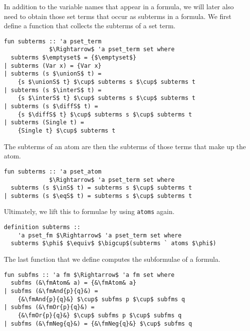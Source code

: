 \documentclass[sigplan,10pt,anonymous,review]{acmart}
\newcommand{\unionS}{\sqcup_\text{s}}
\newcommand{\interS}{\sqcap_\text{s}}
\newcommand{\diffS}{-_\text{s}}
\newcommand{\inS}{\in_\text{s}}
\newcommand{\eqS}{=_\text{s}}
\newcommand{\fmAnd}[2]{#1 $\boldsymbol{\land}$ #2}
\newcommand{\fmOr}[2]{#1 $\boldsymbol{\lor}$ #2}
\newcommand{\fmNegSymbol}{\boldsymbol{\neg}}
\newcommand{\fmNeg}[1]{$\fmNegSymbol$ #1}
\newcommand{\fmAtom}{\textbf{A}}
\begin{document}
In addition to the variable names that appear in a formula, we will later also need to obtain those set terms that occur as subterms in a formula. 
We first define a function that collects the subterms of a set term.
\begin{lstlisting}
fun subterms :: 'a pset_term
             $\Rightarrow$ 'a pset_term set where
  subterms $\emptyset$ = {$\emptyset$}
| subterms (Var x) = {Var x}
| subterms (s $\unionS$ t) =
    {s $\unionS$ t} $\cup$ subterms s $\cup$ subterms t
| subterms (s $\interS$ t) =
    {s $\interS$ t} $\cup$ subterms s $\cup$ subterms t
| subterms (s $\diffS$ t) =
    {s $\diffS$ t} $\cup$ subterms s $\cup$ subterms t
| subterms (Single t) =
    {Single t} $\cup$ subterms t
\end{lstlisting}
The subterms of an atom are then the subterms of those terms that make up the atom.
\begin{lstlisting}
fun subterms :: 'a pset_atom
             $\Rightarrow$ 'a pset_term set where
  subterms (s $\inS$ t) = subterms s $\cup$ subterms t
| subterms (s $\eqS$ t) = subterms s $\cup$ subterms t
\end{lstlisting}
Ultimately, we lift this to formulae by using \lstinline!atoms! again.
\begin{lstlisting}
definition subterms ::
    'a pset_fm $\Rightarrow$ 'a pset_term set where
  subterms $\phi$ $\equiv$ $\bigcup$(subterms ` atoms $\phi$)
\end{lstlisting}
The last function that we define computes the subformulae of a formula.
\begin{lstlisting}
fun subfms :: 'a fm $\Rightarrow$ 'a fm set where
  subfms (&\fmAtom& a) = {&\fmAtom& a}
| subfms (&\fmAnd{p}{q}&) =
    {&\fmAnd{p}{q}&} $\cup$ subfms p $\cup$ subfms q
| subfms (&\fmOr{p}{q}&) =
    {&\fmOr{p}{q}&} $\cup$ subfms p $\cup$ subfms q
| subfms (&\fmNeg{q}&) = {&\fmNeg{q}&} $\cup$ subfms q
\end{lstlisting}
\end{document}
